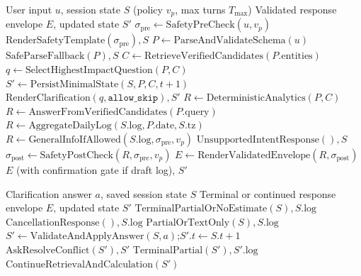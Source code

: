 \documentclass[conference]{IEEEtran}
\begin{document}
\begin{algorithm}[t]
\caption{Non-Blocking Multi-Intent Request Handling}
\label{alg:agent}
\begin{algorithmic}[1]
\Require User input $u$, session state $S$ (policy $v_p$, max turns $T_{\max}$)
\Ensure Validated response envelope $E$, updated state $S'$
\State $\sigma_{\text{pre}} \gets \text{SafetyPreCheck}(u, v_p)$
    \State \Return $\text{RenderSafetyTemplate}(\sigma_{\text{pre}}), S$
\EndIf
\State $P \gets \text{ParseAndValidateSchema}(u)$
    \State \Return $\text{SafeParseFallback}(P), S$
\EndIf
{}
    \State $C \gets \text{RetrieveVerifiedCandidates}(P.\text{entities})$
        \State $q \gets \text{SelectHighestImpactQuestion}(P, C)$
        \State $S' \gets \text{PersistMinimalState}(S, P, C, t{+}1)$
        \State \Return $\text{RenderClarification}(q, \texttt{allow\_skip}), S'$
    \EndIf
    \State $R \gets \text{DeterministicAnalytics}(P, C)$ 
    \State $R \gets \text{AnswerFromVerifiedCandidates}(P.\text{query})$
    \State $R \gets \text{AggregateDailyLog}(S.\text{log}, P.\text{date}, S.\text{tz})$
    \State $R \gets \text{GeneralInfoIfAllowed}(S.\text{log}, \sigma_{\text{pre}}, v_p)$
\Else
    \State \Return $\text{UnsupportedIntentResponse}(), S$
\EndIf
\State $\sigma_{\text{post}} \gets \text{SafetyPostCheck}(R, \sigma_{\text{pre}}, v_p)$
\State $E \gets \text{RenderValidatedEnvelope}(R, \sigma_{\text{post}})$
\State \Return $E$ (with confirmation gate if draft log), $S'$
\end{algorithmic}
\end{algorithm}

\begin{algorithm}[t]
\caption{Bounded Clarification Resumption}
\label{alg:resume}
\begin{algorithmic}[1]
\Require Clarification answer $a$, saved session state $S$
\Ensure Terminal or continued response envelope $E$, updated state $S'$
    \State \Return $\text{TerminalPartialOrNoEstimate}(S), S.\text{log}$
\EndIf
{}
    \State \Return $\text{CancellationResponse}(), S.\text{log}$
    \State \Return $\text{PartialOrTextOnly}(S), S.\text{log}$
\EndIf
\State $S' \gets \text{ValidateAndApplyAnswer}(S, a)$;\quad $S'.t \gets S.t + 1$
        \State \Return $\text{AskResolveConflict}(S'), S'$
    \Else
        \State \Return $\text{TerminalPartial}(S'), S'.\text{log}$
    \EndIf
\EndIf
\State \Return $\text{ContinueRetrievalAndCalculation}(S')$
\end{algorithmic}
\end{algorithm}
\end{document}
